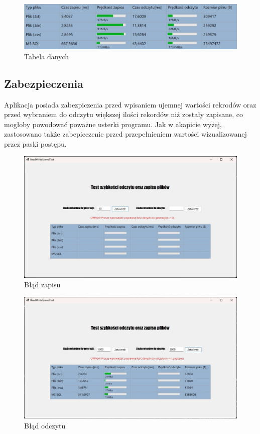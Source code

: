 \documentclass{report}
\begin{document}
\begin{figure}[h]
\centering
\includegraphics[width=15cm]{img/tab.jpg}
\caption{Tabela danych}
\end{figure}

\subsection{Zabezpieczenia}
Aplikacja posiada zabezpiczenia przed wpisaniem ujemnej wartości rekrodów oraz przed wybraniem do odczytu większej ilości rekordów niż zostały zapisane, co mogłoby powodować poważne usterki programu. Jak w akapicie wyżej, zastosowano także zabepieczenie przed przepełnieniem wartości wizualizowanej przez paski postępu.

\begin{figure}[H]
\centering
\includegraphics[width=15cm]{img/zapis_error.jpg}
\caption{Błąd zapisu}
\end{figure}

\begin{figure}[H]
\centering
\includegraphics[width=15cm]{img/odczyt_error.jpg}
\caption{Błąd odczytu}
\end{figure}
\end{document}
